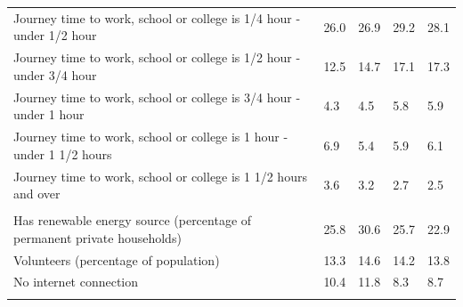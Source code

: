 \documentclass{article}
\begin{document}
\begin{table}[h]
\begin{tabular}{KTTTT}
Journey time to work, school or college is 1/4 hour - under 1/2 hour & 26.0& 26.9& 29.2& 28.1\\
Journey time to work, school or college is 1/2 hour - under 3/4 hour & 12.5& 14.7& 17.1& 17.3\\
Journey time to work, school or college is 3/4 hour - under 1 hour & 4.3& 4.5& 5.8& 5.9\\
Journey time to work, school or college is 1 hour - under 1 1/2 hours & 6.9& 5.4& 5.9& 6.1\\
Journey time to work, school or college is 1 1/2 hours and over & 3.6& 3.2& 2.7& 2.5\\
\hline
    \\ 
    \hline
Has renewable energy source (percentage of permanent private households) & 25.8& 30.6& 25.7& 22.9\\
    \hline
Volunteers (percentage of population) & 13.3& 14.6& 14.2& 13.8\\
    \hline
No internet connection& 10.4& 11.8&  8.3&  8.7\\
\hline
\end{tabular}
\end{table}
\end{document}
